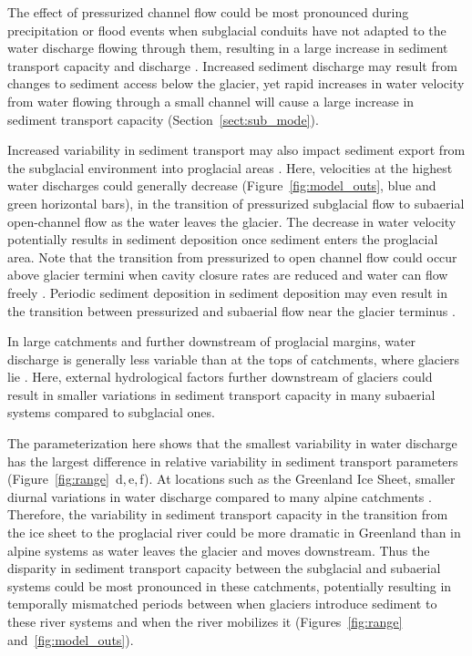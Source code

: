 \documentclass[11pt]{article}
\begin{document}
\begin{spacing}{1}
  The effect of pressurized channel flow could be most pronounced during precipitation or flood events when subglacial conduits have not adapted to the water discharge flowing through them, resulting in a  large increase in sediment transport capacity and discharge \citep[e.g.][]{cowan1988,delaney2019}.
  Increased sediment discharge may result from changes to sediment access below the glacier, yet rapid increases in water velocity from water flowing through a small channel will cause a large increase in sediment transport capacity (Section~\ref{sect:sub_mode}).
  
  Increased variability in sediment transport may also impact sediment export from the subglacial environment into proglacial areas \citep[e.g.][]{delaney2017,perolo2018}.
  Here, velocities at the highest water discharges could generally decrease (Figure~\ref{fig:model_outs}, blue and green horizontal bars), in the transition of pressurized subglacial flow to subaerial open-channel flow as the water leaves the glacier. The decrease in water velocity potentially results in sediment deposition once sediment enters the proglacial area.
  Note that the transition from pressurized to open channel flow could occur above glacier termini when cavity closure rates are reduced and water can flow freely \citep{egli2021b}. 
  Periodic sediment deposition in sediment deposition may even result in the transition between pressurized and subaerial flow near the glacier terminus \citep{perolo2018}.
  
  In large catchments and further downstream of proglacial margins, water discharge is generally less variable than at the tops of catchments, where glaciers lie \citep[c.f.][]{swift2005,riihimaki2005,costa2017,vanas2017,hasholt2018}.
  Here, external hydrological factors further downstream of glaciers could result in smaller variations in sediment transport capacity in many subaerial systems compared to subglacial ones.

  The parameterization here shows that the smallest variability in water discharge has the largest difference in relative variability in sediment transport parameters (Figure~\ref{fig:range}\, d,\,e,\,f).
  At locations such as the Greenland Ice Sheet, smaller diurnal variations in water discharge compared to many alpine catchments \citep[c.f.][]{swift2005,riihimaki2005,hasholt2018}.
  Therefore, the variability in sediment transport capacity in the transition from the ice sheet to the proglacial river could be more dramatic in Greenland than in alpine systems as water leaves the glacier and moves downstream.
  Thus the disparity in sediment transport capacity between the subglacial and subaerial systems could be most pronounced in these catchments, potentially resulting in temporally mismatched periods between when glaciers introduce sediment to these river systems  and when the river mobilizes it (Figures~\ref{fig:range}~ and~\ref{fig:model_outs}).
  

\end{spacing}
\end{document}
